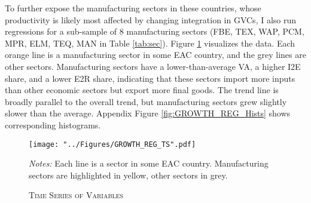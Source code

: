 \documentclass[a4paper]{article}
\begin{document}
To further expose the manufacturing sectors in these countries, whose productivity is likely most affected by changing integration in GVCs, I also run regressions for a sub-sample of 8 manufacturing sectors (FBE, TEX, WAP, PCM, MPR, ELM, TEQ, MAN in Table \ref{tab:sec}). Figure \ref{fig:GROWTH_REG_TS} visualizes the data. Each orange line is a manufacturing sector in some EAC country, and the grey lines are other sectors. Manufacturing sectors have a lower-than-average VA, a higher I2E share, and a lower E2R share, indicating that these sectors import more inputs than other economic sectors but export more final goods. The trend line is broadly parallel to the overall trend, but manufacturing sectors grew slightly slower than the average. Appendix Figure \ref{fig:GROWTH_REG_Hists} shows corresponding histograms. 

\begin{figure}[h!]
\centering
\caption{\label{fig:GROWTH_REG_TS}\textsc{Time Series of Variables}}
\texttt{[image: "../Figures/GROWTH\_REG\_TS".pdf]}
\raggedright
\scriptsize
\emph{Notes:} Each line is a sector in some EAC country. Manufacturing sectors are highlighted in yellow, other sectors in grey. 
\end{figure}
\FloatBarrier
\end{document}
